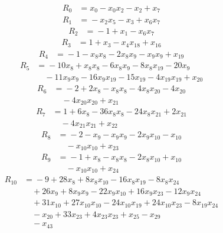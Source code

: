 \begingroup\small
\begin{align*}
R_{0}&={}x_{0} -x_{0}x_{2} -x_{2} +x_{7}
\end{align*}
\begin{align*}
R_{1}&={}-x_{2}x_{5} -x_{3} +x_{6}x_{7}
\end{align*}
\begin{align*}
R_{2}&={}-1 +x_{1} -x_{6}x_{7}
\end{align*}
\begin{align*}
R_{3}&={}1 +x_{3} -x_{4}x_{18} +x_{16}
\end{align*}
\begin{align*}
R_{4}&={}-1 -x_{8}x_{8} -2x_{8}x_{9} -x_{9}x_{9} +x_{19}
\end{align*}
\begin{align*}
R_{5}&={}-10x_{8} +x_{8}x_{8} -6x_{8}x_{9} -8x_{8}x_{19} -20x_{9}\\
&\quad{}-11x_{9}x_{9} -16x_{9}x_{19} -15x_{19} -4x_{19}x_{19} +x_{20}
\end{align*}
\begin{align*}
R_{6}&={}-2 +2x_{8} -x_{8}x_{8} -4x_{8}x_{20} -4x_{20}\\
&\quad{}-4x_{20}x_{20} +x_{21}
\end{align*}
\begin{align*}
R_{7}&={}1 +6x_{8} -36x_{8}x_{8} -24x_{8}x_{21} +2x_{21}\\
&\quad{}-4x_{21}x_{21} +x_{22}
\end{align*}
\begin{align*}
R_{8}&={}-2 -x_{9} -x_{9}x_{9} -2x_{9}x_{10} -x_{10}\\
&\quad{}-x_{10}x_{10} +x_{23}
\end{align*}
\begin{align*}
R_{9}&={}-1 +x_{8} -x_{8}x_{8} -2x_{8}x_{10} +x_{10}\\
&\quad{}-x_{10}x_{10} +x_{24}
\end{align*}
\begin{align*}
R_{10}&={}-9 +28x_{8} +8x_{8}x_{10} -16x_{8}x_{19} -8x_{8}x_{24}\\
&\quad{}+26x_{9} +8x_{9}x_{9} -22x_{9}x_{10} +16x_{9}x_{23} -12x_{9}x_{24}\\
&\quad{}+31x_{10} +27x_{10}x_{10} -24x_{10}x_{19} +24x_{10}x_{23} -8x_{19}x_{24}\\
&\quad{}-x_{20} +33x_{23} +4x_{23}x_{23} +x_{25} -x_{29}\\
&\quad{}-x_{43}
\end{align*}
